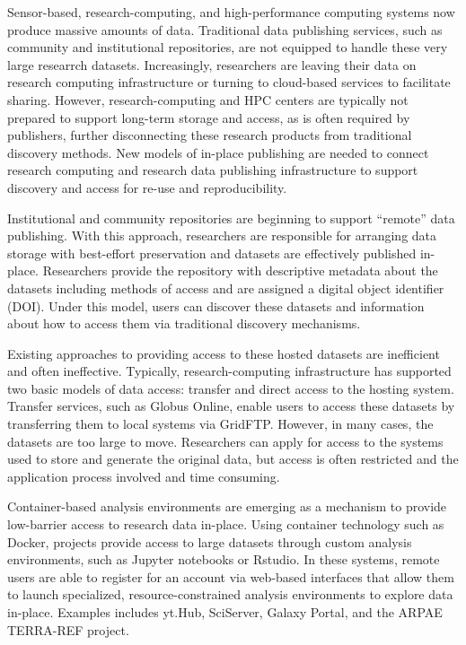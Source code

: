 \documentclass{sig-alternate}
\begin{document}
Sensor-based, research-computing, and high-performance computing systems now produce massive amounts of data.  Traditional data publishing services, such as community and institutional repositories, are not equipped to handle these very large researrch datasets.  Increasingly, researchers are leaving their data on research computing infrastructure or turning to cloud-based services to facilitate sharing. However, research-computing and HPC centers are typically not prepared to support long-term storage and access, as is often required by publishers, further disconnecting these research products from traditional discovery methods. New models of in-place publishing are needed to connect research computing and research data publishing infrastructure to support discovery and access for re-use and reproducibility.

Institutional and community repositories are beginning to support ``remote'' data publishing.  With this approach, researchers are responsible for arranging data storage with best-effort preservation and datasets are effectively published in-place. Researchers provide the repository with descriptive metadata about the datasets including methods of access and are assigned a digital object identifier (DOI).  Under this model, users can discover these datasets and information about how to access them via traditional discovery mechanisms. 

Existing approaches to providing access to these hosted datasets are inefficient and often ineffective.  Typically, research-computing infrastructure has supported two basic models of data access: transfer and direct access to the hosting system.  Transfer services, such as Globus Online, enable users to access these datasets by transferring them to local systems via GridFTP.  However, in many cases, the datasets are too large to move. Researchers can apply for access to the systems used to store and generate the original data, but access is often restricted and the application process involved and time consuming.

Container-based analysis environments are emerging as a mechanism to provide low-barrier access to research data in-place.  Using container technology such as Docker, projects provide access to large datasets through custom analysis environments, such as Jupyter notebooks or Rstudio.  In these systems, remote users are able to register for an account via web-based interfaces that allow them to launch specialized, resource-constrained analysis environments to explore data in-place. Examples includes yt.Hub, SciServer, Galaxy Portal, and the ARPAE TERRA-REF project.
\end{document}
